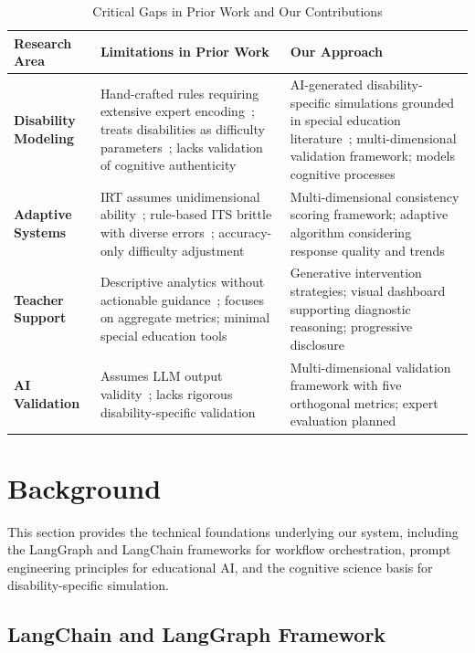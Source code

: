 \documentclass[11pt]{article}
\begin{document}
\begin{table}[t]
\centering
\caption{Critical Gaps in Prior Work and Our Contributions}
\label{tab:gap-analysis}
\begin{tabular}{p{2.5cm}p{5.5cm}p{5.5cm}}
\toprule
\textbf{Research Area} & \textbf{Limitations in Prior Work} & \textbf{Our Approach} \\
\midrule
\textbf{Disability Modeling} & 
Hand-crafted rules requiring extensive expert encoding~\cite{ref9,ref10}; treats disabilities as difficulty parameters~\cite{ref14}; lacks validation of cognitive authenticity & 
AI-generated disability-specific simulations grounded in special education literature~\cite{ref6,ref7}; multi-dimensional validation framework; models cognitive processes \\
\addlinespace
\textbf{Adaptive Systems} & 
IRT assumes unidimensional ability~\cite{ref11}; rule-based ITS brittle with diverse errors~\cite{ref12}; accuracy-only difficulty adjustment & 
Multi-dimensional consistency scoring framework; adaptive algorithm considering response quality and trends \\
\addlinespace
\textbf{Teacher Support} & 
Descriptive analytics without actionable guidance~\cite{ref24,ref25}; focuses on aggregate metrics; minimal special education tools~\cite{ref45} & 
Generative intervention strategies; visual dashboard supporting diagnostic reasoning; progressive disclosure \\
\addlinespace
\textbf{AI Validation} & 
Assumes LLM output validity~\cite{ref18,ref19}; lacks rigorous disability-specific validation & 
Multi-dimensional validation framework with five orthogonal metrics; expert evaluation planned \\
\bottomrule
\end{tabular}
\end{table}

\section{Background}\label{sec:background}

This section provides the technical foundations underlying our system, including the LangGraph and LangChain frameworks for workflow orchestration, prompt engineering principles for educational AI, and the cognitive science basis for disability-specific simulation.

\subsection{LangChain and LangGraph Framework}
\end{document}
